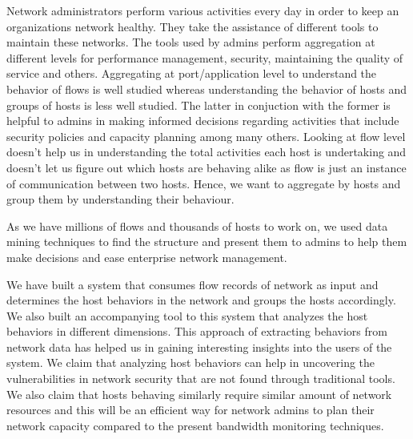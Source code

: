 
Network administrators perform various activities every day in order to keep an organizations network healthy. They take the assistance of different tools to maintain these networks. The tools used by admins perform aggregation at different levels for performance management, security, maintaining the quality of service and others. Aggregating at port/application level to understand the behavior of flows is well studied whereas understanding the
behavior of hosts and groups of hosts is less well studied. The latter in conjuction with the former is helpful to admins in making
informed decisions regarding activities that include security policies and capacity planning among
many others. Looking at flow level doesn’t help us in understanding the total activities each host is
undertaking and doesn’t let us figure out which hosts are behaving alike as flow is just an instance of
communication between two hosts. Hence, we want to aggregate by hosts and group them by
understanding their behaviour.

As we have millions of flows and thousands of hosts to work on, we used data mining techniques to find the structure and present them to admins to help them
make decisions and ease enterprise network management.

We have built a system that consumes flow records of network as input and determines the host behaviors in the network and groups the hosts accordingly. We also built an accompanying tool to this system that analyzes the host behaviors in different dimensions. This approach of extracting behaviors from network data has helped us in gaining interesting insights into the users of the system. We claim that analyzing host behaviors can help in uncovering the vulnerabilities in network security that are not found through traditional tools. We also claim that hosts behaving similarly require similar amount of network resources and this will be an efficient way for network admins to plan their network capacity compared to the present bandwidth monitoring techniques.   